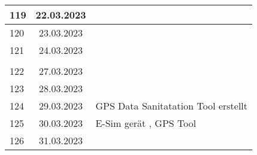 \begin{longtable}{|l|c|l|}
119 & 22.03.2023    &                                                       \\ \hline
120 & 23.03.2023    &                                                       \\ \hline
121 & 24.03.2023    &                                                       \\ \hline
&               &                                                       \\ \hline 
122 & 27.03.2023    &                                                       \\ \hline
123 & 28.03.2023    &                                                       \\ \hline
124 & 29.03.2023    &  GPS Data Sanitatation Tool erstellt                                                  \\ \hline
125 & 30.03.2023    &  E-Sim gerät \q{ausgetauscht}, GPS Tool                                                    \\ \hline
126 & 31.03.2023    &                                                       \\ \hline












\end{longtable}